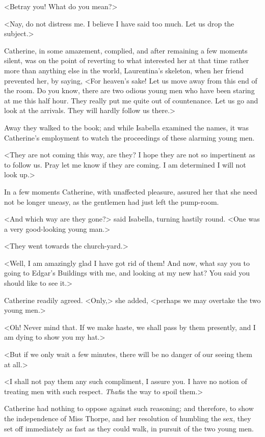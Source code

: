  <Betray you! What do you mean?> 

 <Nay, do not distress me. I believe I have said too much. Let us drop the subject.> 

 Catherine, in some amazement, complied, and after remaining a few moments silent, was on the point of reverting to what interested her at that time rather more than anything else in the world, Laurentina's skeleton, when her friend prevented her, by saying, <For heaven's sake! Let us move away from this end of the room. Do you know, there are two odious young men who have been staring at me this half hour. They really put me quite out of countenance. Let us go and look at the arrivals. They will hardly follow us there.> 

 Away they walked to the book; and while Isabella examined the names, it was Catherine's employment to watch the proceedings of these alarming young men. 

 <They are not coming this way, are they? I hope they are not so impertinent as to follow us. Pray let me know if they are coming. I am determined I will not look up.> 

 In a few moments Catherine, with unaffected pleasure, assured her that she need not be longer uneasy, as the gentlemen had just left the pump-room. 

 <And which way are they gone?> said Isabella, turning hastily round. <One was a very good-looking young man.> 

 <They went towards the church-yard.> 

 <Well, I am amazingly glad I have got rid of them! And now, what say you to going to Edgar's Buildings with me, and looking at my new hat? You said you should like to see it.> 

 Catherine readily agreed. <Only,> she added, <perhaps we may overtake the two young men.> 

 <Oh! Never mind that. If we make haste, we shall pass by them presently, and I am dying to show you my hat.> 

 <But if we only wait a few minutes, there will be no danger of our seeing them at all.> 

 <I shall not pay them any such compliment, I assure you. I have no notion of treating men with such respect. \textit{That}is the way to spoil them.> 

 Catherine had nothing to oppose against such reasoning; and therefore, to show the independence of Miss Thorpe, and her resolution of humbling the sex, they set off immediately as fast as they could walk, in pursuit of the two young men. 